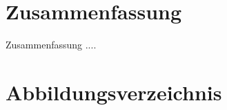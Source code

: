 \documentclass[
	11pt,								%
	a4paper,						%
	oneside,						%
	titlepage,					%
	headsepline,				%
	DIV13,							%
	abstracton,	 				%
	BCOR0cm,						%
	bibliography=totoc, %
]{scrreprt}							%
\begin{document}
\chapter{Zusammenfassung}
\label{cha:Zusammenfassung}
Zusammenfassung ....

\chapter{Abbildungsverzeichnis}
\label{cha:Abbildungsverzeichnis}




\end{document}

